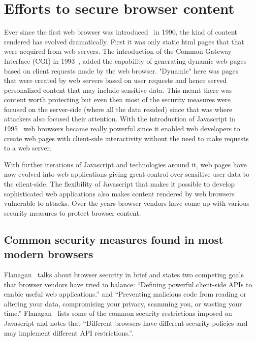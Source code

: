 \section{Efforts to secure browser content}
Ever since the first web browser was introduced~\cite{nexus} in 1990, the kind of
content rendered has evolved dramatically. First it was only static html pages that
that were acquired from web servers. The introduction of the Common Gateway
Interface (CGI) in 1993~\cite{cgi}, added the capability of generating dynamic
web pages based on client requests made by the web browser. "Dynamic" here was
pages that were created by web servers based on user requests and hence served
personalized content that may include sensitive data. This meant there was content
worth protecting but even then most of the security measures were focused
on the server-side (where all the data resided) since that was where attackers
also focused their attention. With the introduction of Javascript in 1995~\cite{js10days}
web browsers became really powerful since it enabled web developers to create web
pages with client-side interactivity without the need to make requests to a web server.

With further iterations of Javascript and technologies around it, web pages have
now evolved into web applications giving great control over sensitive user data to the
client-side. The flexibility of Javascript that makes it possible to develop sophisticated
web applications also makes content rendered by web browsers vulnerable to attacks.
Over the years browser vendors have come up with various security measures to
protect browser content.

\subsection{Common security measures found in most modern browsers}
Flanagan~\cite[Section~13.6]{flanagan2011javascript} talks about browser security
in brief and states two competing goals that browser vendors have tried to balance:
``Defining powerful client-side APIs to enable useful web applications.'' and
``Preventing malicious code from reading or altering your data, compromising your
privacy, scamming you, or wasting your time.'' Flanagan~\cite[Section~13.6.1]{flanagan2011javascript}
lists some of the common security restrictions imposed on Javascript and notes
that ``Different browsers have different security policies and may implement
different API restrictions.''.

